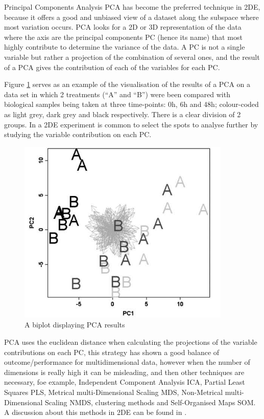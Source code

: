 Principal Components Analysis PCA has become the preferred technique in 2DE, because it offers a good and unbiased view of a dataset along the subspace where most variation occurs. PCA looks for a 2D or 3D representation of the data where the axis are the principal components PC (hence its name) that most highly contribute to determine the variance of the data. A PC is not a single variable but rather a projection of the combination of several ones, and the result of a PCA gives the contribution of each of the variables for each PC.

Figure \ref{fig:PCA} serves as an example of the visualisation of the results of a PCA on a data set in which 2 treatments (``A'' and ``B'') were been compared with biological samples being taken at three time-points: 0h, 6h and 48h; colour-coded as light grey, dark grey and black respectively. There is a clear division of 2 groups. In a 2DE experiment is common to select the spots to analyse further by studying the variable contribution on each PC.

\begin{figure}  
\centering
\includegraphics[width=4in]{figures/PCA.png}
\caption[Example of a PCA result plot.]{A biplot displaying PCA results 
\label{fig:PCA}}
\end{figure}

PCA uses the euclidean distance when calculating the projections of the variable contributions on each PC, this strategy has shown a good balance of outcome/performance for multidimensional data, however when the number of dimensions is really high it can be misleading, and then other techniques are  necessary, foe example, Independent Component Analysis ICA, Partial Least Squares PLS, Metrical multi-Dimensional Scaling MDS, Non-Metrical multi-Dimensional Scaling NMDS, clustering methods and Self-Organised Maps SOM. A discussion about this methods in 2DE can be found in \cite{SIL2014}.



